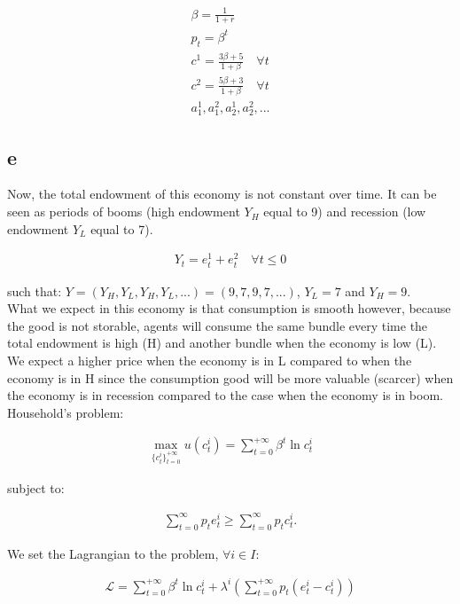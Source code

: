 \documentclass{article}
\begin{document}
\begin{gather*}
    \beta=\frac{1}{1+r}\\
    p_t=\beta^t\\
    c^1=\frac{3\beta+5}{1+\beta}\quad\forall t \\
    c^2=\frac{5\beta+3}{1+\beta}\quad\forall t \\
    a_1^1, a_1^2, a_2^1, a_2^2, ...
\end{gather*}

\subsection{e}

Now, the total endowment of this economy is not constant over time. It can be seen as periods of booms (high endowment $Y_H$ equal to 9) and recession (low endowment $Y_L$ equal to 7).

\begin{gather*}
    Y_t=e_t^1+e_t^2\quad\forall t\leq 0
\end{gather*}

such that: $Y=(Y_H, Y_L, Y_H, Y_L, ...)=(9,7,9,7,...)$, $Y_L=7$ and $Y_H=9$. \\

What we expect in this economy is that consumption is smooth however, because the good is not storable, agents will consume the same bundle every time the total endowment is high (H) and another bundle when the economy is low (L). We expect a higher price when the economy is in L compared to when the economy is in H since the consumption good will be more valuable (scarcer) when the economy is in recession compared to the case when the economy is in boom.\\

Household's problem:

\begin{gather*}
  \max_{\{c_t^i\}^{+\infty}_{t=0}}u(c_t^i)=\sum_{t=0}^{+\infty}\beta^t\ln c_t^i
\end{gather*}

subject to:

\begin{gather*}
    \sum^{\infty }_{t=0} p_{t}e^{i}_{t} \geq \sum^{\infty }_{t=0} p_{t}c^{i}_{t}.
\end{gather*}

We set the Lagrangian to the problem, $\forall i\in I$:

\begin{gather*}
    \mathcal{L}=\sum_{t=0}^{+\infty}\beta^t\ln c_t^i+\lambda^i\left(\sum_{t=0}^{+\infty}p_t(e_t^i-c_t^i)\right)
\end{gather*}
\end{document}
